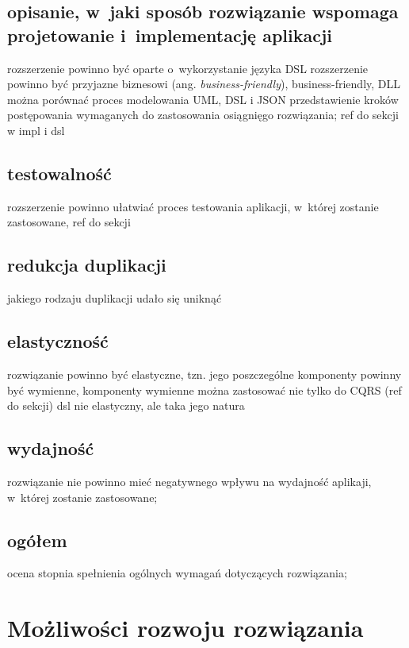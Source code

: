 \subsection{opisanie, w~jaki sposób rozwiązanie wspomaga projetowanie i~implementację aplikacji}

rozszerzenie powinno być oparte o~wykorzystanie języka DSL
rozszerzenie powinno być przyjazne biznesowi (ang. \emph{business-friendly}),
business-friendly, DLL
można porównać proces modelowania UML, DSL i JSON
przedstawienie kroków postępowania wymaganych do zastosowania osiągnięgo rozwiązania; ref do sekcji w impl i dsl

\subsection{testowalność}

rozszerzenie powinno ułatwiać proces testowania aplikacji, w~której zostanie zastosowane,
ref do sekcji


\subsection{redukcja duplikacji}

jakiego rodzaju duplikacji udało się uniknąć


\subsection{elastyczność}

rozwiązanie powinno być elastyczne, tzn. jego poszczególne komponenty powinny być wymienne,
komponenty wymienne
można zastosować nie tylko do CQRS (ref do sekcji)
dsl nie elastyczny, ale taka jego natura


\subsection{wydajność}

rozwiązanie nie powinno mieć negatywnego wpływu na wydajność aplikaji, w~której zostanie zastosowane;


\subsection{ogółem}

ocena stopnia spełnienia ogólnych wymagań dotyczących rozwiązania;



\section{Możliwości rozwoju rozwiązania}

